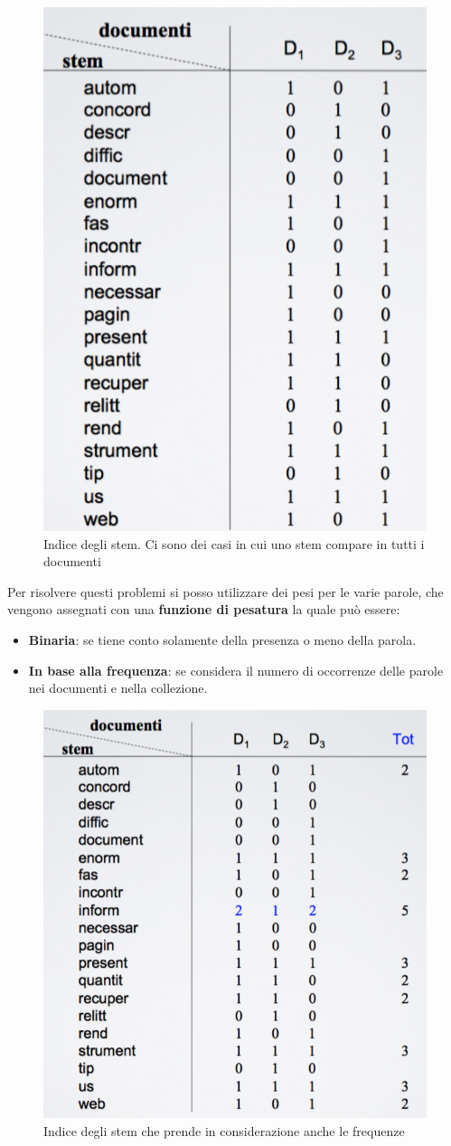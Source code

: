 \begin{figure}[ht]
\begin{minipage}[b]{0.45\linewidth}
\end{minipage}
\quad
\begin{minipage}[b]{0.45\linewidth}
	\centering
  \includegraphics[width=0.7\linewidth]{images/l5-index-2}
  \caption{Indice degli stem. Ci sono dei casi in cui uno stem compare in tutti i documenti}
\end{minipage}
\end{figure}

Per risolvere questi problemi si posso utilizzare dei pesi per le varie parole, che vengono assegnati con una \textbf{funzione di pesatura} la quale può essere:

\begin{itemize}
	\item \textbf{Binaria}: se tiene conto solamente della presenza o meno della parola.
	\item \textbf{In base alla frequenza}: se considera il numero di occorrenze delle parole nei documenti e nella collezione.
\end{itemize}

\begin{figure}[htbp]
	\centering
	\includegraphics[width=0.4\linewidth]{images/l5-index-3}
	\caption{Indice degli stem che prende in considerazione anche le frequenze}
	\label{fig:l5-index-3}
\end{figure}


